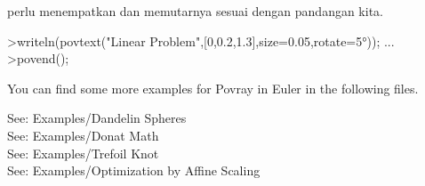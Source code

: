 \documentclass[a4paper,10pt]{article}
\begin{document}
\begin{eulernotebook}
\begin{eulercomment}
\begin{eulercomment}
\begin{eulercomment}
\begin{eulercomment}
\begin{eulercomment}
\begin{eulercomment}
\begin{eulercomment}
\begin{eulercomment}
\begin{eulercomment}
\begin{eulercomment}
\begin{eulercomment}
perlu menempatkan dan memutarnya sesuai dengan pandangan kita.
\end{eulercomment}
\begin{eulerprompt}
>writeln(povtext("Linear Problem",[0,0.2,1.3],size=0.05,rotate=5°)); ...
>povend();
\end{eulerprompt}
\begin{eulercomment}
You can find some more examples for Povray in Euler in the following
files.

See: Examples/Dandelin Spheres\\
See: Examples/Donat Math\\
See: Examples/Trefoil Knot\\
See: Examples/Optimization by Affine Scaling


\end{eulercomment}
\end{eulercomment}
\end{eulercomment}
\end{eulercomment}
\end{eulercomment}
\end{eulercomment}
\end{eulercomment}
\end{eulercomment}
\end{eulercomment}
\end{eulercomment}
\end{eulercomment}
\end{eulernotebook}
\end{document}
